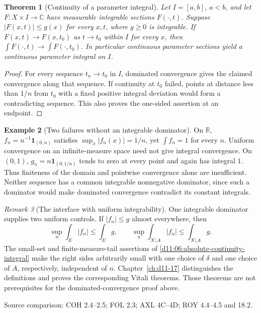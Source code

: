 \documentclass[11pt,oneside,openany]{book}
\newtheorem{theorem}{Theorem}[chapter]
\theoremstyle{definition}
\newtheorem{example}[theorem]{Example}
\theoremstyle{remark}
\newtheorem{remark}[theorem]{Remark}
\newcommand{\R}{\mathbb R}\newcommand{\C}{\mathbb C}
\newcommand{\one}{\mathbf1}\newcommand{\ind}[1]{\mathbf1_{#1}}
\newcommand{\family}[1]{}
\newcommand{\source}[1]{\par\begingroup\small\sffamily\color{black!65}Source comparison: #1\par\endgroup}
\begin{document}
\begin{theorem}[Continuity of a parameter integral]
\family{D11.06.parameter_continuity}\label{d11:06:parameter-continuity}
Let $I=[a,b]$, $a<b$, and let $F:X\times I\to\C$ have measurable
integrable sections $F(\cdot,t)$. Suppose $|F(x,t)|\leq g(x)$ for every
$x,t$, where $g\geq0$ is integrable. If $F(x,t)\to F(x,t_0)$ as
$t\to t_0$ within $I$ for every $x$, then
$\int F(\cdot,t)\to\int F(\cdot,t_0)$. In particular continuous
parameter sections yield a continuous parameter integral on $I$.
\end{theorem}
\begin{proof}
For every sequence $t_n\to t_0$ in $I$, dominated convergence gives the
claimed convergence along that sequence. If continuity at $t_0$ failed,
points at distance less than $1/n$ from $t_0$ with a fixed positive
integral deviation would form a contradicting sequence. This also proves
the one-sided assertion at an endpoint.
\end{proof}

\begin{example}[Two failures without an integrable dominator]
\family{D11.06.domination_counterexamples}\label{d11:06:domination-counterexamples}
On $\R$, $f_n=n^{-1}\one_{(0,n)}$ satisfies $\sup_x|f_n(x)|=1/n$,
yet $\int f_n=1$ for every $n$. Uniform convergence on an infinite-measure
space need not give integral convergence. On $(0,1)$,
$g_n=n\one_{(0,1/n)}$ tends to zero at every point and again has integral
$1$. Thus finiteness of the domain and pointwise convergence alone are
insufficient. Neither sequence has a common integrable nonnegative
dominator, since such a dominator would make dominated convergence
contradict its constant integrals.
\end{example}

\begin{remark}[The interface with uniform integrability]
\family{D11.06.vitali_route}\label{d11:06:vitali-route}
One integrable dominator supplies two uniform controls. If $|f_n|\leq g$
almost everywhere, then
\[
 \sup_n\int_E|f_n|\leq\int_Eg,
 \qquad
 \sup_n\int_{X\setminus A}|f_n|\leq\int_{X\setminus A}g.
\]
The small-set and finite-measure-tail assertions of
\cref{d11:06:absolute-continuity-integral} make the right sides arbitrarily
small with one choice of $\delta$ and one choice of $A$, respectively,
independent of $n$. Chapter~\ref{ch:d11-17} distinguishes the definitions
and proves the corresponding Vitali theorems. Those theorems are not
prerequisites for the dominated-convergence proof above.
\end{remark}
\source{COH 2.4--2.5; FOL 2.3; AXL 4C--4D; ROY 4.4--4.5 and 18.2.}
\end{document}
